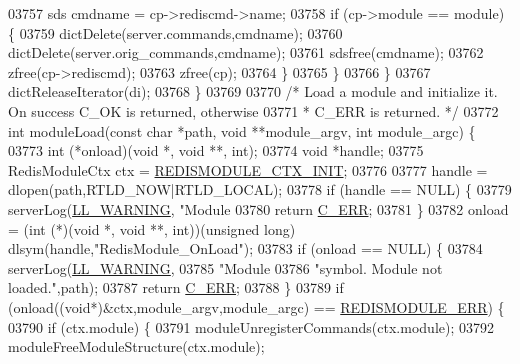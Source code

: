 \begin{DoxyCode}
{{{{{{{{{{{{03757             sds cmdname = cp->rediscmd->name;
03758             \textcolor{keywordflow}{if} (cp->module == module) \{
03759                 dictDelete(server.commands,cmdname);
03760                 dictDelete(server.orig\_commands,cmdname);
03761                 sdsfree(cmdname);
03762                 zfree(cp->rediscmd);
03763                 zfree(cp);
03764             \}
03765         \}
03766     \}
03767     dictReleaseIterator(di);
03768 \}
03769 
03770 \textcolor{comment}{/* Load a module and initialize it. On success C\_OK is returned, otherwise}
03771 \textcolor{comment}{ * C\_ERR is returned. */}
03772 \textcolor{keywordtype}{int} moduleLoad(\textcolor{keyword}{const} \textcolor{keywordtype}{char} *path, \textcolor{keywordtype}{void} **module\_argv, \textcolor{keywordtype}{int} module\_argc) \{
03773     \textcolor{keywordtype}{int} (*onload)(\textcolor{keywordtype}{void} *, \textcolor{keywordtype}{void} **, \textcolor{keywordtype}{int});
03774     \textcolor{keywordtype}{void} *handle;
03775     RedisModuleCtx ctx = \hyperlink{module_8c_a7a80fb134c35b70c7cfe920ea1033bcd}{REDISMODULE\_CTX\_INIT};
03776 
03777     handle = dlopen(path,RTLD\_NOW|RTLD\_LOCAL);
03778     \textcolor{keywordflow}{if} (handle == NULL) \{
03779         serverLog(\hyperlink{server_8h_a31229b9334bba7d6be2a72970967a14b}{LL\_WARNING}, \textcolor{stringliteral}{"Module %
03780         \textcolor{keywordflow}{return} \hyperlink{server_8h_af98ac28d5f4d23d7ed5985188e6fb7d1}{C\_ERR};
03781     \}
03782     onload = (\textcolor{keywordtype}{int} (*)(\textcolor{keywordtype}{void} *, \textcolor{keywordtype}{void} **, \textcolor{keywordtype}{int}))(\textcolor{keywordtype}{unsigned} \textcolor{keywordtype}{long}) dlsym(handle,\textcolor{stringliteral}{"RedisModule\_OnLoad"});
03783     \textcolor{keywordflow}{if} (onload == NULL) \{
03784         serverLog(\hyperlink{server_8h_a31229b9334bba7d6be2a72970967a14b}{LL\_WARNING},
03785             \textcolor{stringliteral}{"Module %
03786             \textcolor{stringliteral}{"symbol. Module not loaded."},path);
03787         \textcolor{keywordflow}{return} \hyperlink{server_8h_af98ac28d5f4d23d7ed5985188e6fb7d1}{C\_ERR};
03788     \}
03789     \textcolor{keywordflow}{if} (onload((\textcolor{keywordtype}{void}*)&ctx,module\_argv,module\_argc) == \hyperlink{redismodule_8h_a3df6f5bd5247289e66f44437a7cddd49}{REDISMODULE\_ERR}) \{
03790         \textcolor{keywordflow}{if} (ctx.module) \{
03791             moduleUnregisterCommands(ctx.module);
03792             moduleFreeModuleStructure(ctx.module);
}}}}}}}}}}}}}}
\end{DoxyCode}
